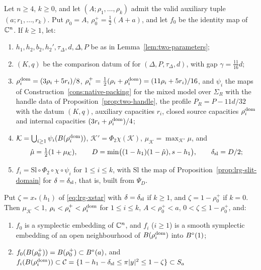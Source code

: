 \begin{theorem}\label{thm:two-packing}\label{thm:lrg-high}
Let $n\ge4$, $k\ge0$, and let $(A;\rho_1,\dots,\rho_k)$ admit the valid auxiliary tuple $(a;r_1,\dots,r_k)$. Put $\rho_0=A$,
$\rho_0^+=\frac12(A+a)$, and let $f_0$ be the identity map of $\mathbb{C}^n$. If $k\ge1$, let:
\begin{enumerate}[label=(\alph*)]
\item $h_1,h_2,b_2,h_2',\tau_\Delta,d,\Delta,P$ be as in Lemma~\ref{lem:two-parameters};
\item $(K,q)$ be the comparison datum of  for $(\Delta,P,\tau_\Delta,d)$, with gap $\gamma=\frac{11}{16}d$;
\item $\rho_i^{\rm dom}=(3\rho_i+5r_i)/8$, $\rho_i^+=\frac12(\rho_i+\rho_i^{\rm dom})=(11\rho_i+5r_i)/16$, and $\psi_i$ the maps of
 Construction~\ref{cons:native-packing} for the mixed model over $\Sigma_R$ with the handle data of
 Proposition~\ref{prop:two-handle}, the profile $P_R=P-11d/32$ with the datum $(K,q)$, auxiliary capacities $r_i$,
 closed source capacities $\rho_i^{\rm dom}$ and internal capacities $(3r_i+\rho_i^{\rm dom})/4$;
\item $\mathcal K=\bigcup_{i\ge1}\psi_i(B(\rho_i^{\rm dom}))$, $\mathcal K'=\Phi_2\chi(\mathcal K)$, $\mu_{\mathcal K}=\max_{\mathcal K'}\mu$, and
\[
 \hat\mu=\tfrac12(1+\mu_{\mathcal K}),\qquad
 D=\min\bigl((1-h_1)(1-\hat\mu),s-h_1\bigr),\qquad \delta_{\rm sl}=D/2;
\]
\item $f_i=\mathrm{Sl}\circ\Phi_2\circ\chi\circ\psi_i$ for $1\le i\le k$, with $\mathrm{Sl}$ the map of
 Proposition~\ref{prop:lrg-slit-domain} for $\delta=\delta_{\rm sl}$, that is, built from $\Psi_D$.
\end{enumerate}
Put $\zeta=x_*(h_1)$ of \eqref{eq:lrg-xstar} with $\delta=\delta_{\rm sl}$ if $k\ge1$, and $\zeta=1-\rho_0^+$ if $k=0$. Then
$\mu_{\mathcal K}<1$, $\rho_i<\rho_i^+<\rho_i^{\rm dom}$ for $1\le i\le k$, $A<\rho_0^+<a$, $0<\zeta\le1-\rho_0^+$, and:
\begin{enumerate}[label=(\roman*)]
\item $f_0$ is a symplectic embedding of $\mathbb{C}^n$, and $f_i$ ($i\ge1$) is a smooth symplectic embedding of an open
 neighbourhood of $B(\rho_i^{\rm dom})$ into $B^{\circ}(1)$;
\item $f_0(B(\rho_0^+))=B(\rho_0^+)\subset B^{\circ}(a)$, and $f_i(B(\rho_i^{\rm dom}))\subset\mathcal C=\{1-h_1-\delta_{\rm sl}\le\pi|y|^2\le1-\zeta\}\subset S_a$

\end{enumerate}
\end{theorem}
